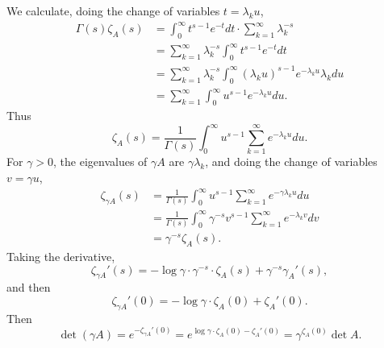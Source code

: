 \documentclass{article}
\theoremstyle{definition}
\theoremstyle{definition}
\begin{document}
We calculate, doing the change of variables $t=\lambda_k u$,
\begin{align*}
\Gamma(s) \zeta_A(s)&=\int_0^\infty t^{s-1} e^{-t} dt \cdot \sum_{k=1}^\infty \lambda_k^{-s}\\
&=\sum_{k=1}^\infty  \lambda_k^{-s}  \int_0^\infty t^{s-1} e^{-t}dt\\
&=\sum_{k=1}^\infty \lambda_k^{-s} \int_0^\infty (\lambda_k u)^{s-1} e^{-\lambda_k u} \lambda_k du\\
&=\sum_{k=1}^\infty \int_0^\infty u^{s-1} e^{-\lambda_k u} du.
\end{align*}
Thus
\[
\zeta_A(s) = \frac{1}{\Gamma(s)} \int_0^\infty u^{s-1} \sum_{k=1}^\infty e^{-\lambda_k u} du.
\]
For $\gamma>0$, the eigenvalues of $\gamma A$ are $\gamma \lambda_k$, and doing the change of variables
$v=\gamma u$,
\begin{align*}
\zeta_{\gamma A}(s) &=\frac{1}{\Gamma(s)} \int_0^\infty u^{s-1} \sum_{k=1}^\infty e^{-\gamma \lambda_k u} du\\
&= \frac{1}{\Gamma(s)} \int_0^\infty \gamma^{-s} v^{s-1} \sum_{k=1}^\infty e^{-\lambda_k v} dv\\
&=\gamma^{-s} \zeta_A(s).
\end{align*}
Taking the derivative,
\[
\zeta_{\gamma A}'(s) = -\log \gamma \cdot \gamma^{-s} \cdot \zeta_A(s) + \gamma^{-s} \gamma_A'(s),
\]
and then
\[
\zeta_{\gamma A}'(0) = -\log \gamma \cdot \zeta_A(0) + \zeta_A'(0). 
\]
Then
\[
\det (\gamma A) = e^{-\zeta_{\gamma A}'(0)} = e^{\log \gamma \cdot \zeta_A(0) - \zeta_A'(0)}
=\gamma^{\zeta_A(0)} \det A.
\]
\end{document}
